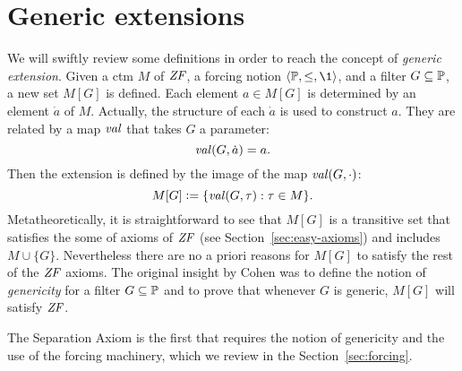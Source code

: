 \section{Generic extensions}
\label{sec:generic-extensions}
We will swiftly review some definitions in order to reach the concept
of \emph{generic extension}. Given a ctm $M$ of $\mathit{ZF}$, a forcing
notion $\lb\PP,\leq,\1\rb$, and a filter
$G\subseteq\mathbb{P}$, a new set $M[G]$ is defined. Each element $a\in M[G]$ is
determined by an element $\dot a$ of $M$. Actually, the structure of
each $\dot a$ is used to construct $a$. They are related by a
map $\operatorname{\mathit{val}}$ that takes $G$ a parameter:
\[
\operatorname{\mathit{val}}(G,\dot a) = a.
\] 
Then the extension is defined by the image of the map $\operatorname{\mathit{val}}(G,\cdot)$:
\[
M[G] \mathrel{\mathop:}= \{\operatorname{\mathit{val}}(G,\tau): \tau\in M\}.
\]
Metatheoretically, it is straightforward to see that $M[G]$ is a
transitive set that satisfies the some of axioms of $\mathit{ZF}$ (see
Section~\ref{sec:easy-axioms}) and 
includes $M\cup\{G\}$. Nevertheless there are no a priori reasons for
$M[G]$ to satisfy the rest of the $\mathit{ZF}$ 
axioms. The original insight by Cohen was to define the notion of
\emph{genericity} for a filter $G\subseteq\mathbb{P}$ and to prove that whenever
$G$ is generic, $M[G]$ will satisfy $\mathit{ZF}$.

The Separation Axiom  is the first that requires the notion of
genericity and the use of the forcing machinery, which we review in
the Section~\ref{sec:forcing}.

